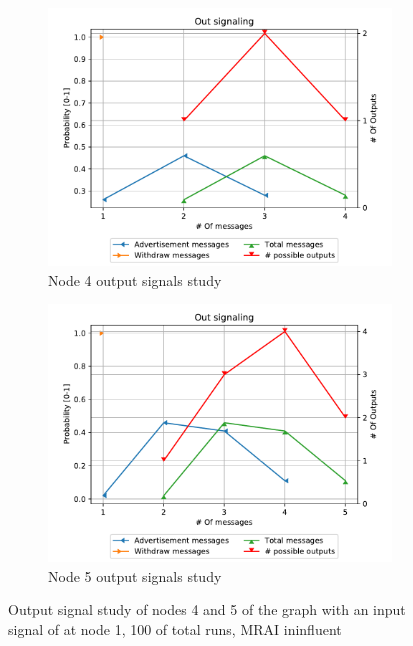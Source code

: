 \begin{figure}[h]
     \centering
     \begin{subfigure}[b]{0.45\textwidth}
         \centering
         \includegraphics[width=\textwidth]{images/signal_study/fig_4/fig_4_4_signaling_nmessage_prob.pdf}
		 \caption{Node \num{4} output signals study}
         \label{fig:signal_node4}
     \end{subfigure}
     \hfill
     \begin{subfigure}[b]{0.45\textwidth}
         \centering
         \includegraphics[width=\textwidth]{images/signal_study/fig_4/fig_4_5_signaling_nmessage_prob.pdf}
		 \caption{Node \num{5} output signals study}
         \label{fig:signal_node5}
     \end{subfigure}
		\caption{Output signal study of nodes \num{4} and \num{5} of the graph
			 with an input signal of  at node \num{1},
			\num{100} of total runs, \ac{MRAI} ininfluent}
        \label{fig:signal_griffin_fig4}
\end{figure}

